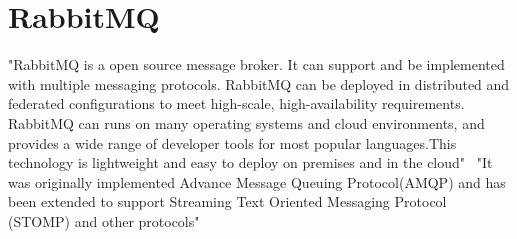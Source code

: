 \section{RabbitMQ}

"RabbitMQ is a open source message broker. It can support and be implemented with 
multiple messaging protocols. RabbitMQ can be deployed in distributed and federated 
configurations to meet high-scale, high-availability requirements. RabbitMQ can runs
on many operating systems and cloud environments, and provides a wide range of developer
tools for most popular languages.This technology is lightweight and easy to deploy on
premises and in the cloud"~\cite{hid-sp18-520-RabbitMQ}
"It was originally implemented Advance Message Queuing Protocol(AMQP) and has been extended to 
support Streaming Text Oriented Messaging Protocol (STOMP) and other protocols"~\cite{hid-sp18-520-RabbitMQ-wiki}